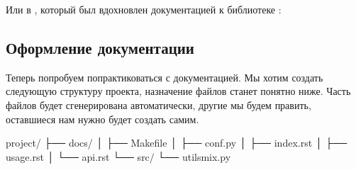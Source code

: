 \documentclass[letterpaper,10pt,russian]{sphinxmanual}
\begin{document}
\sphinxAtStartPar
Или в , который был вдохновлен документацией к библиотеке :

\begin{sphinxVerbatim}[commandchars=\\\{\}]
  



     
\end{sphinxVerbatim}


\subsection{Оформление документации}
\label{\detokenize{educational_materials/docs/content:id12}}
\sphinxAtStartPar
Теперь попробуем попрактиковаться с документацией. Мы хотим создать следующую структуру проекта, назначение файлов станет понятно ниже. Часть файлов будет сгенерирована автоматически, другие мы будем править, оставшиеся нам нужно будет создать самим.

\begin{sphinxVerbatim}[commandchars=\\\{\}]
project/
├── docs/
│   ├── Makefile
│   ├── conf.py
│   ├── index.rst
│   ├── usage.rst
│   └── api.rst
└── src/
    └── utils\PYGZus{}mix.py

\end{sphinxVerbatim}
\end{document}
